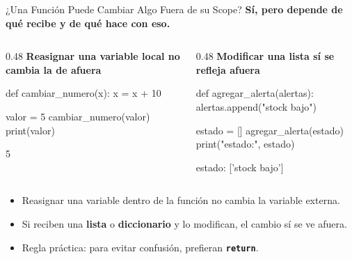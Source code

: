 \documentclass[aspectratio=169, 11pt]{beamer}
\begin{document}
\begin{frame}[fragile,shrink=30]{¿Una Función Puede Cambiar Algo Fuera de su Scope?}
  \vspace{-6pt}
  {\footnotesize\color{arcaDark}\bfseries
    Sí, pero depende de \textbf{qué recibe} y de \textbf{qué hace} con eso.}

  \vspace{2pt}
  \begin{columns}[T]
    \begin{column}{0.48\textwidth}
      {\scriptsize\color{arcaRed}\bfseries\faTimesCircle\hspace{4pt}
        Reasignar una variable local no cambia la de afuera}
      \begin{pyblock}
def cambiar_numero(x):
    x = x + 10

valor = 5
cambiar_numero(valor)
print(valor)
      \end{pyblock}
      \vspace{-2pt}
      \begin{outputblock}
5
      \end{outputblock}
    \end{column}

    \begin{column}{0.48\textwidth}
      {\scriptsize\color{codeGreen}\bfseries\faCheckCircle\hspace{4pt}
        Modificar una lista sí se refleja afuera}
      \begin{pyblock}
def agregar_alerta(alertas):
    alertas.append("stock bajo")

estado = []
agregar_alerta(estado)
print("estado:", estado)
      \end{pyblock}
      \vspace{-2pt}
      \begin{outputblock}
estado: ['stock bajo']
      \end{outputblock}
    \end{column}
  \end{columns}

  \vspace{1pt}
  {\scriptsize\color{textMuted}
  \begin{itemize}\setlength{\itemsep}{3pt}
    \item[{\color{arcaRed}\scriptsize\faArrowRight}]
      Reasignar una variable dentro de la función
      no cambia la variable externa.
    \item[{\color{arcaRed}\scriptsize\faArrowRight}]
      Si reciben una \textbf{lista} o \textbf{diccionario}
      y lo modifican, el cambio sí se ve afuera.
    \item[{\color{arcaRed}\scriptsize\faLightbulb}]
      Regla práctica: para evitar confusión,
      prefieran \textbf{\texttt{return}}.
  \end{itemize}
  }
\end{frame}
\end{document}
